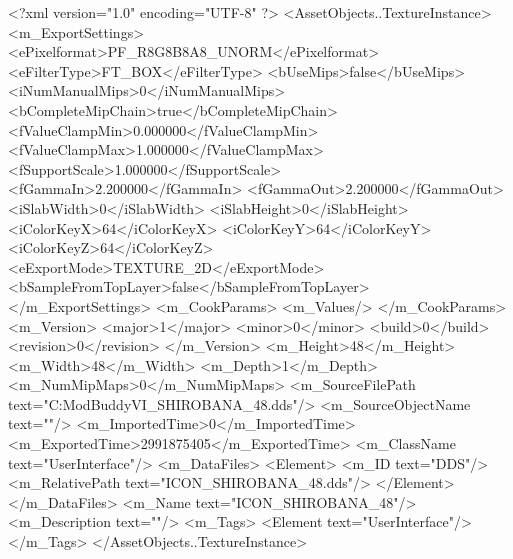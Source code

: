 <?xml version="1.0" encoding="UTF-8" ?>
<AssetObjects..TextureInstance>
	<m_ExportSettings>
		<ePixelformat>PF_R8G8B8A8_UNORM</ePixelformat>
		<eFilterType>FT_BOX</eFilterType>
		<bUseMips>false</bUseMips>
		<iNumManualMips>0</iNumManualMips>
		<bCompleteMipChain>true</bCompleteMipChain>
		<fValueClampMin>0.000000</fValueClampMin>
		<fValueClampMax>1.000000</fValueClampMax>
		<fSupportScale>1.000000</fSupportScale>
		<fGammaIn>2.200000</fGammaIn>
		<fGammaOut>2.200000</fGammaOut>
		<iSlabWidth>0</iSlabWidth>
		<iSlabHeight>0</iSlabHeight>
		<iColorKeyX>64</iColorKeyX>
		<iColorKeyY>64</iColorKeyY>
		<iColorKeyZ>64</iColorKeyZ>
		<eExportMode>TEXTURE_2D</eExportMode>
		<bSampleFromTopLayer>false</bSampleFromTopLayer>
	</m_ExportSettings>
	<m_CookParams>
		<m_Values/>
	</m_CookParams>
	<m_Version>
		<major>1</major>
		<minor>0</minor>
		<build>0</build>
		<revision>0</revision>
	</m_Version>
	<m_Height>48</m_Height>
	<m_Width>48</m_Width>
	<m_Depth>1</m_Depth>
	<m_NumMipMaps>0</m_NumMipMaps>
	<m_SourceFilePath text="C:\Users\asus\Documents\Firaxis ModBuddy\Civilization VI\temppic\ICON_SHIROBANA_48.dds"/>
	<m_SourceObjectName text=""/>
	<m_ImportedTime>0</m_ImportedTime>
	<m_ExportedTime>2991875405</m_ExportedTime>
	<m_ClassName text="UserInterface"/>
	<m_DataFiles>
		<Element>
			<m_ID text="DDS"/>
			<m_RelativePath text="ICON_SHIROBANA_48.dds"/>
		</Element>
	</m_DataFiles>
	<m_Name text="ICON_SHIROBANA_48"/>
	<m_Description text=""/>
	<m_Tags>
		<Element text="UserInterface"/>
	</m_Tags>
</AssetObjects..TextureInstance>

